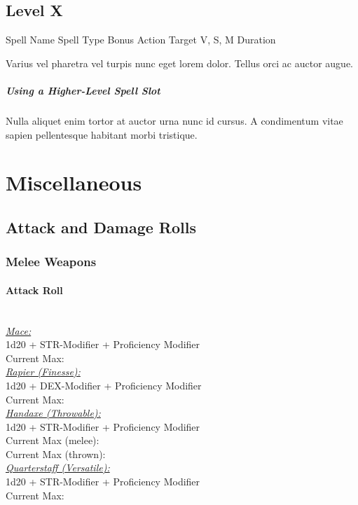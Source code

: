 \documentclass[letterpaper,openany,oneside,twocolumn]{book}
\begin{document}
\subsection*{Level X}

\DndSpellHeader
  {Spell Name}
  {Spell Type}
  {Bonus Action}
  {Target}
  {V, S, M}
  {Duration}

Varius vel pharetra vel turpis nunc eget lorem dolor. Tellus orci ac auctor augue.

\subparagraph*{Using a Higher-Level Spell Slot} Nulla aliquet enim tortor at auctor urna nunc id cursus. A condimentum vitae sapien pellentesque habitant morbi tristique.

\vfill\eject
\section*{Miscellaneous}
\subsection*{Attack and Damage Rolls}
\subsubsection*{Melee Weapons}
\paragraph*{Attack Roll}\hfill\\
\underline{\textit{Mace:}}\\
1d20 + STR-Modifier + Proficiency Modifier\\
\indent Current Max: 
\\
\underline{\textit{Rapier (Finesse):}}\\
1d20 + DEX-Modifier + Proficiency Modifier\\
\indent Current Max: 
\\
\underline{\textit{Handaxe (Throwable):}}\\
1d20 + STR-Modifier + Proficiency Modifier\\
\indent Current Max (melee): \\
\indent Current Max (thrown): 
\\
\underline{\textit{Quarterstaff (Versatile):}}\\
1d20 + STR-Modifier + Proficiency Modifier\\
\indent Current Max: 
\end{document}
